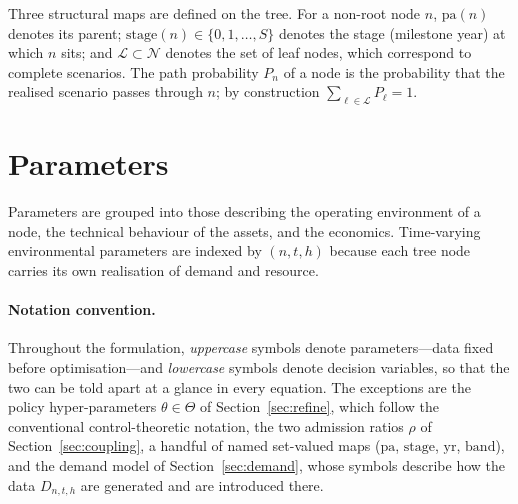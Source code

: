 \documentclass[11pt,a4paper]{article}
\theoremstyle{plain}
\theoremstyle{definition}
\newcommand{\pa}{\mathrm{pa}}
\newcommand{\band}{\mathrm{band}}
\begin{document}
Three structural maps are defined on the tree. For a non-root node $n$, $\pa(n)$ denotes
its parent; $\mathrm{stage}(n)\in\{0,1,\dots,S\}$ denotes the stage (milestone year) at
which $n$ sits; and $\mathcal{L}\subset\mathcal{N}$ denotes the set of leaf nodes, which
correspond to complete scenarios. The path probability $P_n$ of a node is the
probability that the realised scenario passes through $n$; by construction
$\sum_{\ell\in\mathcal{L}}P_\ell=1$.

\section{Parameters}
\label{sec:parameters}

Parameters are grouped into those describing the operating environment of a node, the
technical behaviour of the assets, and the economics. Time-varying environmental
parameters are indexed by $(n,t,h)$ because each tree node carries its own realisation
of demand and resource.

\paragraph{Notation convention.} Throughout the formulation, \emph{uppercase} symbols
denote parameters---data fixed before optimisation---and \emph{lowercase} symbols denote
decision variables, so that the two can be told apart at a glance in every equation. The
exceptions are the policy hyper-parameters $\theta\in\Theta$ of
Section~\ref{sec:refine}, which follow the conventional control-theoretic notation, the
two admission ratios $\rho$ of Section~\ref{sec:coupling}, a handful of named set-valued
maps ($\pa$, $\mathrm{stage}$, $\mathrm{yr}$, $\band$), and the demand model of
Section~\ref{sec:demand}, whose symbols describe how the data $D_{n,t,h}$ are generated
and are introduced there.
\end{document}

